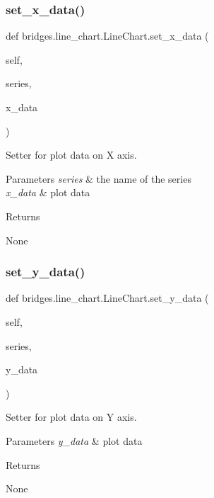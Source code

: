 \subsubsection{\texorpdfstring{set\+\_\+x\+\_\+data()}{set\_x\_data()}}
{\footnotesize\ttfamily def bridges.\+line\+\_\+chart.\+Line\+Chart.\+set\+\_\+x\+\_\+data (\begin{DoxyParamCaption}\item[{}]{self,  }\item[{}]{series,  }\item[{}]{x\+\_\+data }\end{DoxyParamCaption})}



Setter for plot data on X axis. 


\begin{DoxyParams}{Parameters}
{\em series} & the name of the series \\
\hline
{\em x\+\_\+data} & plot data \\
\hline
\end{DoxyParams}
\begin{DoxyReturn}{Returns}


None 
\end{DoxyReturn}
\mbox{\label{classbridges_1_1line__chart_1_1_line_chart_ae5988ed81be128f96d63526560c61d9f}} 
\subsubsection{\texorpdfstring{set\+\_\+y\+\_\+data()}{set\_y\_data()}}
{\footnotesize\ttfamily def bridges.\+line\+\_\+chart.\+Line\+Chart.\+set\+\_\+y\+\_\+data (\begin{DoxyParamCaption}\item[{}]{self,  }\item[{}]{series,  }\item[{}]{y\+\_\+data }\end{DoxyParamCaption})}



Setter for plot data on Y axis. 


\begin{DoxyParams}{Parameters}
{\em y\+\_\+data} & plot data \\
\hline
\end{DoxyParams}
\begin{DoxyReturn}{Returns}


None 
\end{DoxyReturn}
\mbox{\label{classbridges_1_1line__chart_1_1_line_chart_a3361674c961f45bfa058cff38ba49bd8}} 
